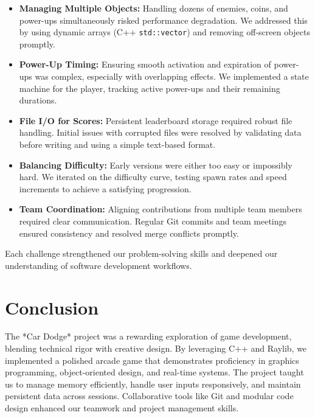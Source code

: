 \documentclass[12pt,a4paper]{article}
\begin{document}
\begin{itemize}
    \item \textbf{Managing Multiple Objects:} Handling dozens of enemies, coins, and power-ups simultaneously risked performance degradation. We addressed this by using dynamic arrays (C++ \texttt{std::vector}) and removing off-screen objects promptly. \\
    \item \textbf{Power-Up Timing:} Ensuring smooth activation and expiration of power-ups was complex, especially with overlapping effects. We implemented a state machine for the player, tracking active power-ups and their remaining durations. \\
    \item \textbf{File I/O for Scores:} Persistent leaderboard storage required robust file handling. Initial issues with corrupted files were resolved by validating data before writing and using a simple text-based format. \\
    \item \textbf{Balancing Difficulty:} Early versions were either too easy or impossibly hard. We iterated on the difficulty curve, testing spawn rates and speed increments to achieve a satisfying progression. \\
    \item \textbf{Team Coordination:} Aligning contributions from multiple team members required clear communication. Regular Git commits and team meetings ensured consistency and resolved merge conflicts promptly. \\
\end{itemize}

Each challenge strengthened our problem-solving skills and deepened our understanding of software development workflows. \\

\section{Conclusion}

The *Car Dodge* project was a rewarding exploration of game development, blending technical rigor with creative design. By leveraging C++ and Raylib, we implemented a polished arcade game that demonstrates proficiency in graphics programming, object-oriented design, and real-time systems. The project taught us to manage memory efficiently, handle user inputs responsively, and maintain persistent data across sessions. Collaborative tools like Git and modular code design enhanced our teamwork and project management skills. \\
\end{document}
